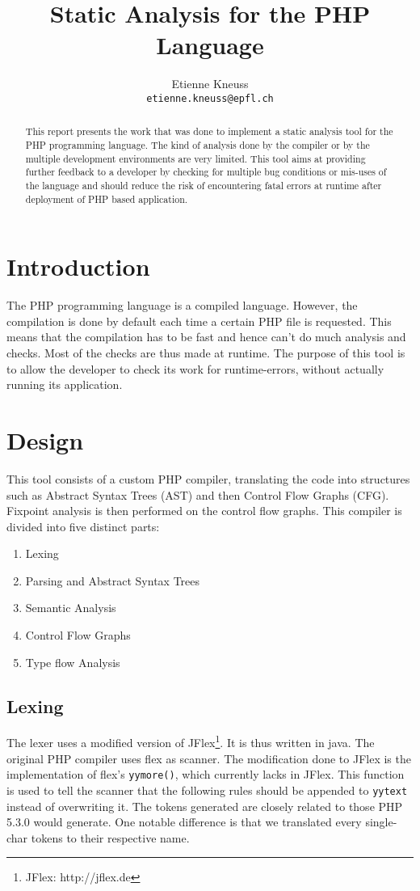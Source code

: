 \documentclass[a4paper]{article}
\author{Etienne Kneuss\\
\texttt{etienne.kneuss@epfl.ch}
}
\title{Static Analysis for the PHP Language}
\begin{document}
\maketitle
\begin{abstract}
  This report presents the work that was done to implement a static analysis
  tool for the PHP programming language. The kind of analysis done by the
  compiler or by the multiple development environments are very limited. This
  tool aims at providing further feedback to a developer by checking for
  multiple bug conditions or mis-uses of the language and should reduce the
  risk of encountering fatal errors at runtime after deployment of PHP based
  application.
\end{abstract}
\section{Introduction}
The PHP programming language is a compiled language. However, the compilation is
done by default each time a certain PHP file is requested. This means that the
compilation has to be fast and hence can't do much analysis and checks. Most of
the checks are thus made at runtime. The purpose of this tool is to allow the
developer to check its work for runtime-errors, without actually running its
application.
\section{Design}
This tool consists of a custom PHP compiler, translating the code
into structures such as Abstract Syntax Trees (AST) and then Control Flow Graphs
(CFG). Fixpoint analysis is then performed on the control flow graphs. This
compiler is divided into five distinct parts:
\begin{enumerate}
  \item Lexing
  \item Parsing and Abstract Syntax Trees
  \item Semantic Analysis
  \item Control Flow Graphs
  \item Type flow Analysis
\end{enumerate}

\subsection{Lexing}
The lexer uses a modified version of JFlex\footnote{JFlex: http://jflex.de}. It
is thus written in java. The original PHP compiler uses flex as scanner. The
modification done to JFlex is the implementation of flex's \verb=yymore()=,
which currently lacks in JFlex. This function is used to tell the scanner that
the following rules should be appended to \verb=yytext= instead of overwriting
it. The tokens generated are closely related to those PHP 5.3.0 would generate.
One notable difference is that we translated every single-char tokens to their
respective name.
\end{document}
